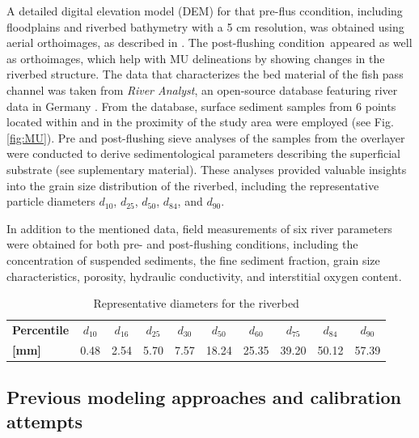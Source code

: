 \documentclass[draft,linenumbers,onecolumn]{agujournal2019} %
\begin{document}
A detailed digital elevation model (DEM) for that pre-flus ccondition, including floodplains and riverbed bathymetry with a 5 cm resolution, was obtained using aerial orthoimages, as described in \cite{schwindt2023fuzzylogic}. The post-flushing condition appeared as well as orthoimages, which help with MU delineations by showing changes in the riverbed structure. The data that characterizes the bed material of the fish pass channel was taken from \textit{River Analyst}, an open-source database featuring river data in Germany \cite{negreiros2023database}. From the database, surface sediment samples from 6 points located within and in the proximity of the study area were employed (see Fig. \ref{fig:MU}). Pre and post-flushing sieve analyses of the samples from the overlayer were conducted to derive sedimentological parameters describing the superficial substrate (see suplementary material). These analyses provided valuable insights into the grain size distribution of the riverbed, including the representative particle diameters \(d_{10}\), \(d_{25}\), \(d_{50}\), \(d_{84}\), and \(d_{90}\).


In addition to the mentioned data, field measurements of six river parameters were obtained for both pre- and post-flushing conditions, including the concentration of suspended sediments, the fine sediment fraction, grain size characteristics, porosity, hydraulic conductivity, and interstitial oxygen content. 

\begin{table}[ht]
	\centering
	\caption{Representative diameters for the riverbed}
	\begin{tabular}{lccccccccc}
		\hline
		\textbf{Percentile} & \(d_{10}\) & \(d_{16}\) & \(d_{25}\) & \(d_{30}\) & \(d_{50}\) & \(d_{60}\) & \(d_{75}\) & \(d_{84}\) & \(d_{90}\) \\
		\textbf{[mm]}       & 0.48      & 2.54      & 5.70      & 7.57      & 18.24     & 25.35     & 39.20     & 50.12     & 57.39     \\
		\hline
	\end{tabular}
	\label{tab:rep_diameters}
\end{table}


\subsection{Previous modeling approaches and calibration attempts}
\label{sec:Sec2.4}
\end{document}
